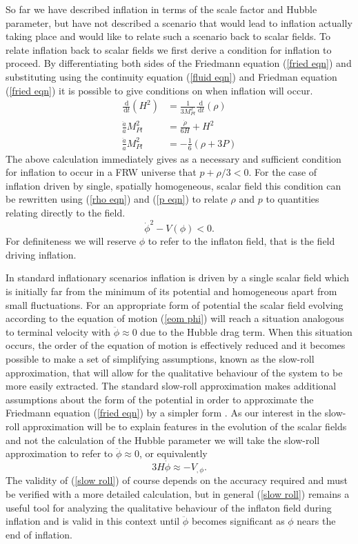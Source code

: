 \documentclass[letterpaper,11pt]{article}
\newcommand{\ud}{\,\mathrm{d}}
\begin{document}
So far we have described inflation in terms of the scale factor and Hubble parameter, but have not described a scenario that would lead to inflation actually taking place and would like to relate such a scenario back to scalar fields. To relate inflation back to scalar fields we first derive a condition for inflation to proceed. By differentiating both sides of the Friedmann equation (\ref{fried eqn}) and substituting using the continuity equation (\ref{fluid eqn}) and Friedman equation (\ref{fried eqn}) it is possible to give conditions on when inflation will occur.
\begin{align}
\frac{\ud}{\ud t}(H^2)&=\frac{1}{3M_{Pl}^2}\frac{\ud}{\ud t}(\rho)\\
\frac{\ddot{a}}{a}M_{Pl}^2&=\frac{\dot{\rho}}{6H}+H^2\\
\frac{\ddot{a}}{a}M_{Pl}^2&=-\frac{1}{6}(\rho+3P)
\end{align}
The above calculation immediately gives as a necessary and sufficient condition for inflation to occur in a FRW universe that $p+\rho/3<0$. For the case of inflation driven by single, spatially homogeneous, scalar field this condition can be rewritten using (\ref{rho eqn}) and (\ref{p eqn}) to relate $\rho$ and $p$ to quantities relating directly to the field.
\begin{equation}
\dot{\phi}^2-V(\phi)<0. \label{inflation condition 3a}
\end{equation}
 For definiteness we will reserve $\phi$ to refer to the inflaton field, that is the field driving inflation.

In standard inflationary scenarios inflation is driven by a single scalar field which is initially far from the minimum of its potential and homogeneous apart from small fluctuations. For an appropriate form of potential the scalar field evolving according to the equation of motion (\ref{eom phi}) will reach a situation analogous to terminal velocity with $\ddot{\phi} \approx 0$ due to the Hubble drag term. When this situation occurs, the order of the equation of motion is effectively reduced and it becomes possible to make a set of simplifying assumptions, known as the slow-roll approximation, that will allow for the qualitative behaviour of the system to be more easily extracted. The standard slow-roll approximation makes additional assumptions about the form of the potential in order to approximate the Friedmann equation (\ref{fried eqn}) by a simpler form \cite{liddle92}. As our interest in the slow-roll approximation will be to explain features in the evolution of the scalar fields and not the calculation of the Hubble parameter we will take the slow-roll approximation to refer to $\ddot{\phi} \approx 0$, or equivalently
\begin{equation}
3H\dot{\phi} \approx - V_{,\phi}. \label{slow roll}
\end{equation}
The validity of (\ref{slow roll}) of course depends on the accuracy required and must be verified with a more detailed calculation, but in general (\ref{slow roll}) remains a useful tool for analyzing the qualitative behaviour of the inflaton field during inflation and is valid in this context until $\ddot{\phi}$ becomes significant as $\phi$ nears the end of inflation.
\end{document}
